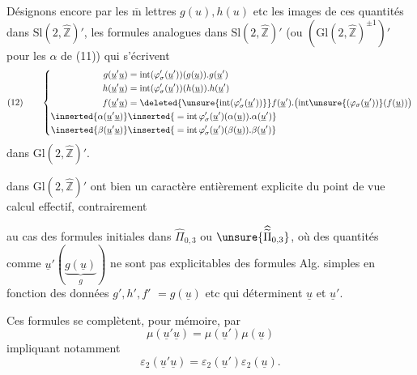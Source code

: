 Désignons encore par les $\overline{\mathrm m}$ lettres $g(u),h(u)$ etc les images de ces quantités dans $\mathrm{Sl}(2,\widehat{\mathbb Z})'$,  les formules analogues dans $\mathrm{Sl}(2,\widehat{\mathbb Z})'$ (ou $(\mathrm{Gl}(2,\widehat{\mathbb Z})^{\pm1})'$ pour  les $\alpha$ de (11)) qui s'écrivent
\[
(12)\qquad\left\{\begin{aligned}
g(\underline u'\underline u)&=\mathrm{int}(\varphi_\sigma'(\underline u'))(g(\underline u)).g(\underline u')\\
h(\underline u'\underline u)&=\mathrm{int}(\varphi_\sigma'(\underline u'))(h(\underline u)).h(\underline u')\\
f(\underline u'\underline u)&=\deleted{\unsure{\mathrm{int}(\varphi_\sigma'(\underline u'))}}f(\underline u').\bigl(\mathrm{int}\unsure{(\varphi_\sigma(\underline u'))}(f(\underline u))\bigr)\\
\inserted{\alpha(\underline u'\underline u)}&\inserted{{}=\mathrm{int}\,\varphi_\sigma'(\underline u')(\alpha(\underline u)).\alpha(\underline u')}\\
\inserted{\beta(\underline u'\underline u)}&\inserted{{}=\mathrm{int}\,\varphi_\sigma'(\underline u')(\beta(\underline u)).\beta(\underline u')}
\end{aligned}\right.
\]
dans $\mathrm{Gl}(2,\widehat{\mathbb Z})'$.

 dans $\mathrm{Gl}(2,\widehat{\mathbb Z})'$ ont bien un caractère entièrement explicite du point de vue calcul effectif, contrairement


au cas des formules initiales dans $\widehat{\Pi}_{0,3}$ ou $\unsure{\widehat{\widetilde{\Pi}}_{0,3}}$, où des quantités comme $\underline{u}'(\underbrace{g(\underline{u})}_{g})$ ne sont pas explicitables   des formules Alg. simples en fonction des données  $g',h',f'$  $=g(\underline{u})$ etc qui déterminent $\underline{u}$ et $\underline{u}'$.

Ces formules se complètent, pour mémoire, par
\[
\tag{13}
\mu(\underline{u}'\underline{u})=\mu(\underline{u}')\mu(\underline{u})
\]
impliquant notamment
\[
\tag{14}
\varepsilon_2(\underline{u}'\underline{u})=\varepsilon_2(\underline{u}')\varepsilon_2(\underline{u}).
\]

